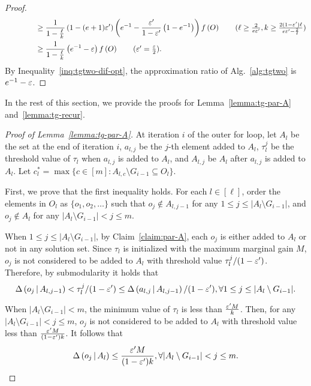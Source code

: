 \begin{proof}
\begin{align*}
&\hspace*{4em} \ge \frac{1}{1-\frac{\ell}{k}} \left(1-(e+1)\epsi'\right)\left(e^{-1} - \frac{\epsi'}{1-\epsi'}\left(1-e^{-1}\right)\right) \ff{O}\tag{$\ell \ge \frac{2}{e\epsi'}, k \ge \frac{2(1-\epsi')\ell}{e\epsi'-\frac{2}{\ell}}$}\\
&\hspace*{4em} \ge \frac{1}{1-\frac{\ell}{k}} \left(e^{-1}-\epsi\right)\ff{O}\tag{$\epsi' = \frac{\epsi}{2}$}.
\end{align*}
By Inequality~\ref{inq:tgtwo-dif-opt},
the approximation ratio of Alg.~\ref{alg:tgtwo} is $e^{-1}-\varepsilon$.
\end{proof}

In the rest of this section, we provide the proofs for 
Lemma~\ref{lemma:tg-par-A} and~\ref{lemma:tg-recur}.
\begin{proof}[Proof of Lemma~\ref{lemma:tg-par-A}]
At iteration $i$ of the outer for loop,
let $A_l$ be the set at the end of iteration $i$,
$a_{l, j}$ be the $j$-th element added to $A_l$,
$\tau_l^j$ be the threshold value of $\tau_l$ when $a_{l, j}$ is added to $A_l$,
and $A_{l, j}$ be $A_l$ after $a_{l, j}$ is added to $A_l$.
Let $c_l^* = \max\{c\in [m]:A_{l, c}\setminus G_{i-1}\subseteq O_l\}$.

First, we prove that the first inequality holds.
For each $l\in [\ell]$, order the elements in $O_l$ as $\{o_1, o_2, \ldots\}$
such that $o_j \not \in A_{l, j-1}$ for any $1\le j \le |A_l\setminus G_{i-1}|$,
and $o_j\not \in A_l$ for any $|A_l\setminus G_{i-1}| < j \le m$.

When $1\le j \le |A_l\setminus G_{i-1}|$, by Claim~\ref{claim:par-A},
each $o_j$ is either added to $A_l$ or not in any solution set.
Since $\tau_l$ is initialized with the maximum marginal gain $M$,
$o_j$ is not considered to be added to $A_l$ with threshold value 
$\tau_l^j/(1-\varepsilon')$.
Therefore, by submodularity it holds that
\begin{equation}\label{inq:tgtwo-1}
\Delta \left( o_j \, \middle| \, A_{l, j-1} \right) < \tau_l^j/(1-\varepsilon')\le \Delta \left( a_{l,j} \, \middle| \, A_{l,j-1} \right)/(1-\varepsilon'),
\forall 1\le j \le |A_l\setminus G_{i-1}|.
\end{equation}

When $|A_l\setminus G_{i-1}| <  m$,
the minimum value of $\tau_l$ is less than $\frac{\varepsilon' M}{k}$.
Then, for any $|A_l\setminus G_{i-1}| < j \le m$,
$o_j$ is not considered to be added to $A_l$ with threshold value less than $\frac{\varepsilon' M}{(1-\varepsilon')k}$.
It follows that 
\begin{equation}\label{inq:tgtwo-2}
\Delta \left( o_j \, \middle| \, A_l \right) \le \frac{\varepsilon' M}{(1-\varepsilon')k},
\forall |A_l\setminus G_{i-1}| < j \le m.
\end{equation}


\end{proof}
